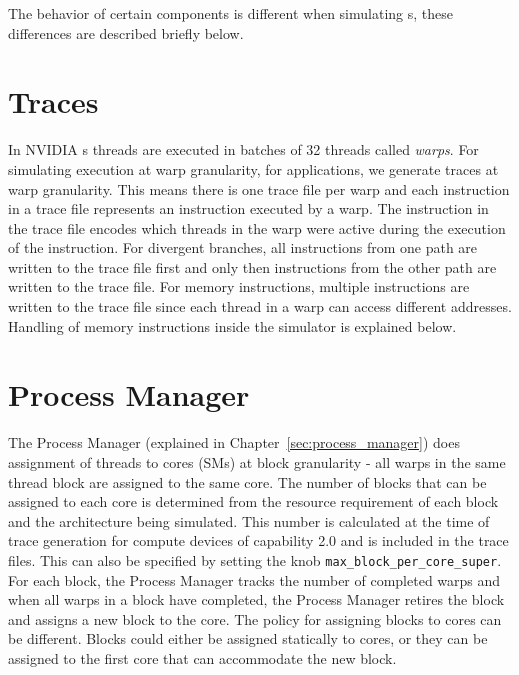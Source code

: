 The behavior of certain components is different when simulating {\gpu}s, these
differences are described briefly below.

\section{Traces}
\label{sec:ptx_traces}

In NVIDIA {\gpu}s threads are executed in batches of 32 threads called
\textit{warps}. For simulating execution at warp granularity, for {\gpu}
applications, we generate traces at warp granularity. This means there
is one trace file per warp and each instruction in a trace file represents an
instruction executed by a warp. The instruction in the trace file encodes which
threads in the warp were active during the execution of the instruction. For
divergent branches, all instructions from one path are written to the trace
file first and only then instructions from the other path are written to the
trace file. For memory instructions, multiple instructions are written to the
trace file since each thread in a warp can access different addresses. Handling
of memory instructions inside the simulator is explained below.


\section{Process Manager}

The Process Manager (explained in Chapter~\ref{sec:process_manager})
does assignment of threads to cores (SMs) at block granularity - all
warps in the same thread block are assigned to the same core. The
number of blocks that can be assigned to each core is determined from
the resource requirement of each block and the {\gpu} architecture being
simulated.  This number is calculated at the time of trace generation
for compute devices of capability 2.0 and is included in the trace
files. This can also be specified by setting the knob
\Verb+max_block_per_core_super+.  For each block, the Process Manager
tracks the number of completed warps and when all warps in a block
have completed, the Process Manager retires the block and assigns a
new block to the core. The policy for assigning blocks to cores can be
different. Blocks could either be assigned statically to cores, or they
can be assigned to the first core that can accommodate the new block.

